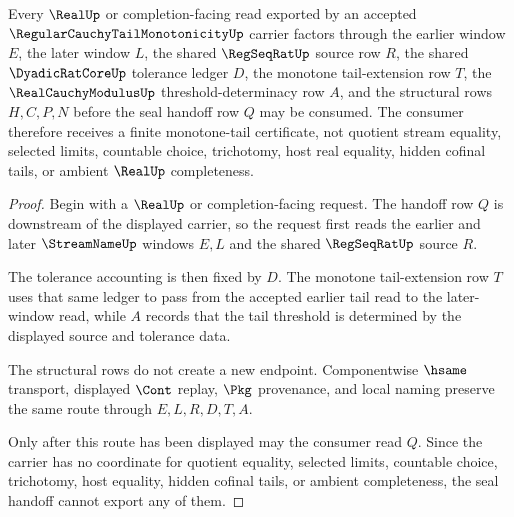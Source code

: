 \begin{theorem}
\label{thm:regular-cauchy-tail-monotonicity-real-seal-factorization}
Every $\RealUp$ or completion-facing read exported by an accepted $\RegularCauchyTailMonotonicityUp$ carrier factors through the earlier window $E$, the later window $L$, the shared $\RegSeqRatUp$ source row $R$, the shared $\DyadicRatCoreUp$ tolerance ledger $D$, the monotone tail-extension row $T$, the $\RealCauchyModulusUp$ threshold-determinacy row $A$, and the structural rows $H,C,P,N$ before the seal handoff row $Q$ may be consumed. The consumer therefore receives a finite monotone-tail certificate, not quotient stream equality, selected limits, countable choice, trichotomy, host real equality, hidden cofinal tails, or ambient $\RealUp$ completeness.
\end{theorem}
\begin{proof}
Begin with a $\RealUp$ or completion-facing request. The handoff row $Q$ is downstream of the displayed carrier, so the request first reads the earlier and later $\StreamNameUp$ windows $E,L$ and the shared $\RegSeqRatUp$ source $R$.

The tolerance accounting is then fixed by $D$. The monotone tail-extension row $T$ uses that same ledger to pass from the accepted earlier tail read to the later-window read, while $A$ records that the tail threshold is determined by the displayed source and tolerance data.

The structural rows do not create a new endpoint. Componentwise $\hsame$ transport, displayed $\Cont$ replay, $\Pkg$ provenance, and local naming preserve the same route through $E,L,R,D,T,A$.

Only after this route has been displayed may the consumer read $Q$. Since the carrier has no coordinate for quotient equality, selected limits, countable choice, trichotomy, host equality, hidden cofinal tails, or ambient completeness, the seal handoff cannot export any of them.
\end{proof}



